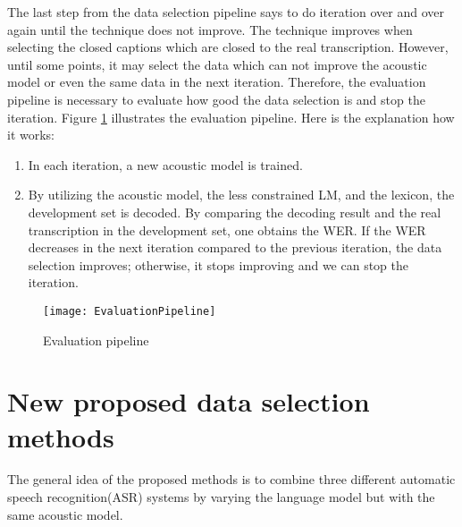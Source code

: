 The last step from the data selection pipeline says to do iteration over and over again until the technique does not improve. The technique improves when selecting the closed captions which are closed to the real transcription. However, until some points, it may select the data which can not improve the acoustic model or even the same data in the next iteration. Therefore, the evaluation pipeline is necessary to  evaluate how good the data selection is and stop the iteration. Figure \ref{evaluationPipeline} illustrates the evaluation pipeline. Here is the explanation how it works:
\begin{enumerate}
\item In each iteration, a new acoustic model is trained.
\item By utilizing the acoustic model, the less constrained LM, and the lexicon, the development set is decoded. By comparing the decoding result and the real transcription in the development set, one obtains the WER.  If the WER decreases in  the next iteration compared to the previous iteration, the data selection improves; otherwise, it stops improving and we can stop the iteration.
\end{enumerate}

\begin{figure}[H]
\caption{Evaluation pipeline}
\label{evaluationPipeline}
\texttt{[image: EvaluationPipeline]} 
\centering
\end{figure}







\section{New proposed data selection methods}
\label{proposedModels}
The general idea of the proposed methods is to combine three different automatic speech recognition(ASR) systems by varying the language model but with the same acoustic model. %

